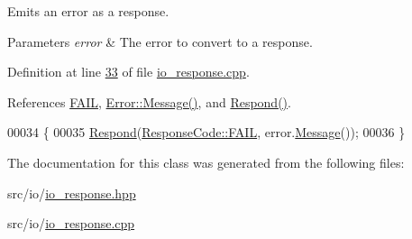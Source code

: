 Emits an error as a response. 


\begin{DoxyParams}{Parameters}
{\em error} & The error to convert to a response. \\
\hline
\end{DoxyParams}


Definition at line \hyperlink{io__response_8cpp_source_l00033}{33} of file \hyperlink{io__response_8cpp_source}{io\+\_\+response.\+cpp}.



References \hyperlink{io__response_8hpp_af5828b68a5f305a17b90321710d9b546ac2759effffc94bb9acc71d69fe3e8a1f}{F\+A\+I\+L}, \hyperlink{errors_8cpp_source_l00017}{Error\+::\+Message()}, and \hyperlink{io__response_8cpp_source_l00025}{Respond()}.


\begin{DoxyCode}
00034 \{
00035     \hyperlink{classResponseSink_ac2add6144c2804a6f0db34ad30046ed7}{Respond}(\hyperlink{io__response_8hpp_af5828b68a5f305a17b90321710d9b546ac2759effffc94bb9acc71d69fe3e8a1f}{ResponseCode::FAIL}, error.\hyperlink{classError_a006605b13a346cf019f60420f1b29b5a}{Message}());
00036 \}
\end{DoxyCode}


The documentation for this class was generated from the following files\+:\begin{DoxyCompactItemize}
\item 
src/io/\hyperlink{io__response_8hpp}{io\+\_\+response.\+hpp}\item 
src/io/\hyperlink{io__response_8cpp}{io\+\_\+response.\+cpp}\end{DoxyCompactItemize}
